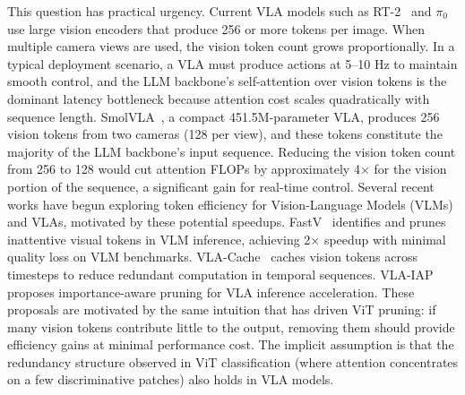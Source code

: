 This question has practical urgency.
Current VLA models such as RT-2~\cite{brohan2023rt2} and $\pi_0$~\cite{black2024pi0} use large vision encoders that produce 256 or more tokens per image.
When multiple camera views are used, the vision token count grows proportionally.
In a typical deployment scenario, a VLA must produce actions at 5--10 Hz to maintain smooth control, and the LLM backbone's self-attention over vision tokens is the dominant latency bottleneck because attention cost scales quadratically with sequence length.
SmolVLA~\cite{shukor2025smolvla}, a compact 451.5M-parameter VLA, produces 256 vision tokens from two cameras (128 per view), and these tokens constitute the majority of the LLM backbone's input sequence.
Reducing the vision token count from 256 to 128 would cut attention FLOPs by approximately 4$\times$ for the vision portion of the sequence, a significant gain for real-time control.
Several recent works have begun exploring token efficiency for Vision-Language Models (VLMs) and VLAs, motivated by these potential speedups.
FastV~\cite{chen2024fastv} identifies and prunes inattentive visual tokens in VLM inference, achieving 2$\times$ speedup with minimal quality loss on VLM benchmarks.
VLA-Cache~\cite{xu2025vlacache} caches vision tokens across timesteps to reduce redundant computation in temporal sequences.
VLA-IAP~\cite{cheng2026vlaiap} proposes importance-aware pruning for VLA inference acceleration.
These proposals are motivated by the same intuition that has driven ViT pruning: if many vision tokens contribute little to the output, removing them should provide efficiency gains at minimal performance cost.
The implicit assumption is that the redundancy structure observed in ViT classification (where attention concentrates on a few discriminative patches) also holds in VLA models.


